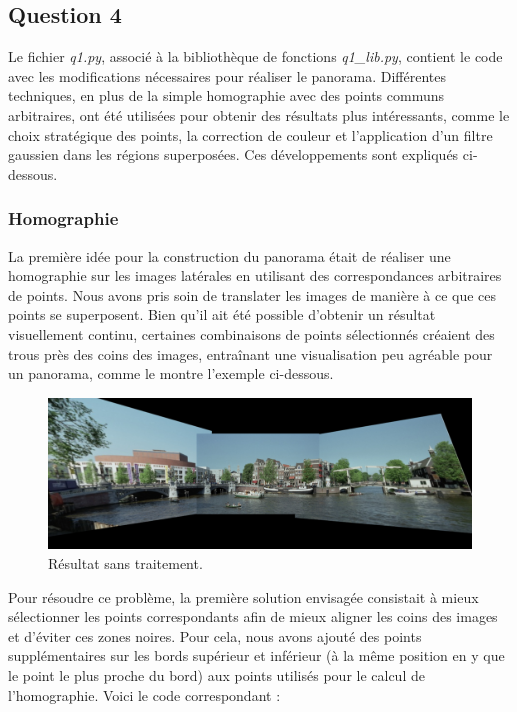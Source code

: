 \documentclass[../5RO17_TP1.tex]{subfiles}
\begin{document}
\subsection{Question 4}

Le fichier \textit{q1.py}, associé à la bibliothèque de fonctions \textit{q1\_lib.py}, contient le code avec les modifications nécessaires pour réaliser le panorama. Différentes techniques, en plus de la simple homographie avec des points communs arbitraires, ont été utilisées pour obtenir des résultats plus intéressants, comme le choix stratégique des points, la correction de couleur et l'application d'un filtre gaussien dans les régions superposées. Ces développements sont expliqués ci-dessous.

\subsubsection{Homographie}

La première idée pour la construction du panorama était de réaliser une homographie sur les images latérales en utilisant des correspondances arbitraires de points. Nous avons pris soin de translater les images de manière à ce que ces points se superposent. Bien qu'il ait été possible d'obtenir un résultat visuellement continu, certaines combinaisons de points sélectionnés créaient des trous près des coins des images, entraînant une visualisation peu agréable pour un panorama, comme le montre l'exemple ci-dessous.

\begin{figure}[h]
    \centering
    \includegraphics[width=0.6\linewidth]{images/amsterdam_0.png}
    \caption{Résultat sans traitement.}
    \label{fig:ams0}
\end{figure}

Pour résoudre ce problème, la première solution envisagée consistait à mieux sélectionner les points correspondants afin de mieux aligner les coins des images et d'éviter ces zones noires. Pour cela, nous avons ajouté des points supplémentaires sur les bords supérieur et inférieur (à la même position en y que le point le plus proche du bord) aux points utilisés pour le calcul de l'homographie. Voici le code correspondant :
\end{document}
